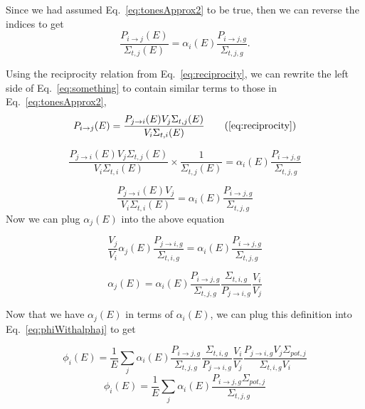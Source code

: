 \documentclass[10pt]{article}
\begin{document}
Since we had assumed Eq.~\ref{eq:tonesApprox2} to be true, then we can reverse the indices to get
\begin{equation}\frac{P_{i\rightarrow j}(E)}{\Sigma_{t,j}(E)}=\alpha_{i}(E)\frac{P_{i\rightarrow j,g}}{\Sigma_{t,j,g}}\label{eq:something}.\end{equation}

Using the reciprocity relation from Eq.~\ref{eq:reciprocity}, we can rewrite the left side of Eq.~\ref{eq:something} to contain similar terms to those in Eq.~\ref{eq:tonesApprox2},
\begin{equation}P_{i\rightarrow j}(E)=\frac{P_{j\rightarrow i}(E)V_{j}\Sigma_{t,j}(E)}{V_{i}\Sigma_{t,i}(E)}\tag{\ref{eq:reciprocity}}\end{equation}


\begin{equation}\frac{P_{j\rightarrow i}(E)V_{j}\Sigma_{t,j}(E)}{V_{i}\Sigma_{t,i}(E)}\times\frac{1}{\Sigma_{t,j}(E)}=\alpha_{i}(E)\frac{P_{i\rightarrow j,g}}{\Sigma_{t,j,g}}\end{equation}

\begin{equation}\frac{P_{j\rightarrow i}(E)V_{j}}{V_{i}\Sigma_{t,i}(E)}=\alpha_{i}(E)\frac{P_{i\rightarrow j,g}}{\Sigma_{t,j,g}}\end{equation}
  Now we can plug $\alpha_j(E)$ into the above equation

\begin{equation}\frac{V_{j}}{V_{i}}\alpha_{j}(E)\frac{P_{j\rightarrow i,g}}{\Sigma_{t,i,g}}=\alpha_{i}(E)\frac{P_{i\rightarrow j,g}}{\Sigma_{t,j,g}}\end{equation}
  
\begin{equation}\alpha_{j}(E)=\alpha_{i}(E)\frac{P_{i\rightarrow j,g}}{\Sigma_{t,j,g}}\frac{\Sigma_{t,i,g}}{P_{j\rightarrow i,g}}\frac{V_{i}}{V_{j}}\end{equation}

  Now that we have $\alpha_j(E)$ in terms of $\alpha_i(E)$, we can plug this definition into Eq.~\ref{eq:phiWithalphaj} to get 

\begin{equation}\phi_{i}(E)=\frac{1}{E}\sum\limits_j\alpha_{i}(E)\frac{P_{i\rightarrow j,g}}{\Sigma_{t,j,g}}\frac{\Sigma_{t,i,g}}{P_{j\rightarrow i,g}}\frac{V_{i}}{V_{j}}\frac{P_{j\rightarrow i,g}V_{j}\Sigma_{pot,j}}{\Sigma_{t,i,g}V_{i}}\end{equation}
  \begin{equation}\phi_{i}(E)=\frac{1}{E}\sum\limits_j\alpha_{i}(E)\frac{P_{i\rightarrow j,g}\Sigma_{pot,j}}{\Sigma_{t,j,g}}\label{eq:again}\end{equation}
\end{document}
